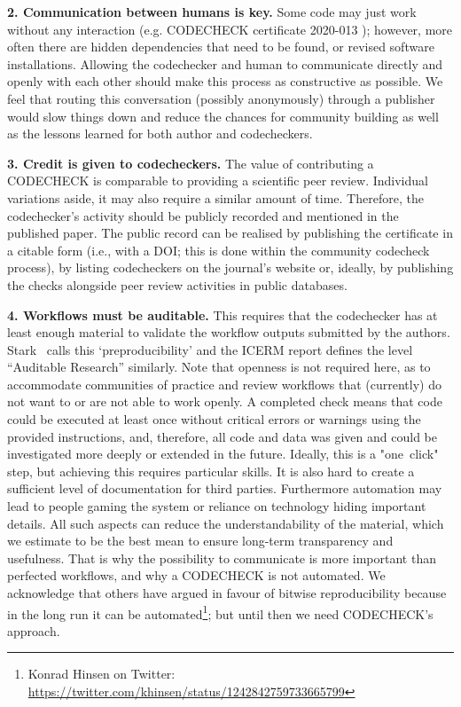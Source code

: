 \documentclass[12pt]{article}
\begin{document}
\textbf{2. Communication between humans is key.} Some code may just
work without any interaction (e.g. CODECHECK certificate 2020-013
\cite{cert-2020-013}); however, more often there are hidden
dependencies that need to be found, or revised software
installations. Allowing the codechecker and human to communicate
directly and openly with each other should make this process as
constructive as possible. We feel that routing this conversation
(possibly anonymously) through a publisher would slow things down and
reduce the chances for community building as well as the lessons
learned for both author and codecheckers.

\textbf{3. Credit is given to codecheckers.} The value of contributing a
CODECHECK is comparable to providing a scientific peer review. Individual
variations aside, it may also require a similar amount of time. Therefore,
the codechecker's activity should be publicly recorded and mentioned in the
published paper.
The public record can be realised by publishing the certificate in a 
citable form (i.e., with a DOI; this is done within the community codecheck
process), by listing codecheckers on the journal's website or, ideally, by
publishing the checks alongside peer review activities in public databases.

\textbf{4. Workflows must be auditable.}
This requires that the codechecker 
has at least enough material to validate the workflow outputs submitted by 
the authors. Stark~\cite{stark_before_2018} calls this `preproducibility'
and the ICERM report \cite{stodden_setting_2013} defines the level
``Auditable Research''  similarly.
Note that openness is not required here, as to accommodate 
communities of practice and review workflows that (currently) do not want
to or are not able to work openly.
A completed check means that code could be executed at least once without
critical errors or
warnings using the provided instructions, and, therefore, all code and data 
was given and could be investigated more deeply or extended in the future.
Ideally, this is a "one~click" step, but achieving this requires particular 
skills. It is also hard to create a sufficient level of documentation for 
third parties. Furthermore automation may lead to people gaming the system
or reliance on technology hiding important details. All such aspects can
reduce the understandability of the material, which we estimate to be the
best mean to ensure long-term transparency and usefulness.
That is why the possibility to communicate is more important
than perfected workflows, and why a CODECHECK is not automated.
We acknowledge that others have argued in favour of bitwise reproducibility
because in the long run it can be automated\footnote{Konrad Hinsen on 
Twitter: \url{https://twitter.com/khinsen/status/1242842759733665799}};
but until then we need CODECHECK's approach.
\end{document}

